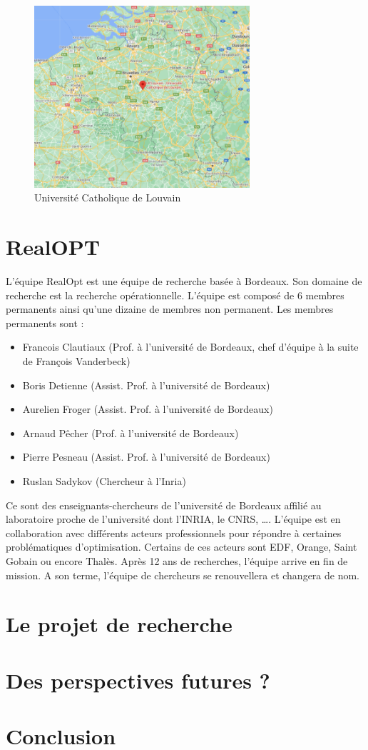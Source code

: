 \documentclass[12pt]{article}
\begin{document}
    \begin{figure}
        \centering
        \includegraphics[width=8cm]{image/Map-UCLouvain.png}
        \caption{Université Catholique de Louvain}
        \label{fig:UC Louvain}
    \end{figure}

    \newpage
    \section{RealOPT}\label{sec:realopt}

    L'équipe RealOpt est une équipe de recherche basée à Bordeaux.
    Son domaine de recherche est la recherche opérationnelle.
    L'équipe est composé de 6 membres permanents ainsi qu'une dizaine de membres non permanent.
    Les membres permanents sont :
    \begin{itemize}
        \item Francois Clautiaux  (Prof. à l'université de Bordeaux, chef d'équipe à la suite de
        François Vanderbeck)
        \item Boris Detienne (Assist. Prof. à l'université de Bordeaux)
        \item Aurelien Froger (Assist. Prof. à l'université de Bordeaux)
        \item Arnaud Pêcher (Prof. à l'université de Bordeaux)
        \item Pierre Pesneau (Assist. Prof. à l'université de Bordeaux)
        \item Ruslan Sadykov (Chercheur à l'Inria)
    \end{itemize}
    Ce sont des enseignants-chercheurs de l'université de Bordeaux affilié au laboratoire proche de l'université
    dont l'INRIA, le CNRS, \ldots .
    L'équipe est en collaboration avec différents acteurs professionnels pour répondre à certaines problématiques
    d'optimisation.
    Certains de ces acteurs sont EDF, Orange, Saint Gobain ou encore Thalès.
    Après 12 ans de recherches, l'équipe arrive en fin de mission.
    A son terme, l'équipe de chercheurs se renouvellera et changera de nom.

    \section{Le projet de recherche}\label{sec:le-projet-de-recherche}


    \section{Des perspectives futures ?}\label{sec:des-perspectives-futures-?}


    \section{Conclusion}\label{sec:conclusion}
\end{document}
